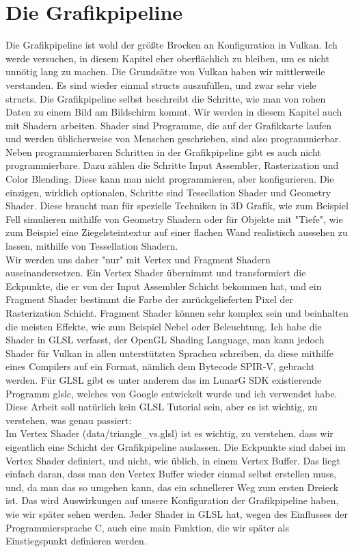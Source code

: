 \documentclass[11pt,a4paper]{report}
\begin{document}
\chapter{Die Grafikpipeline}
Die Grafikpipeline ist wohl der größte Brocken an Konfiguration in Vulkan. Ich werde versuchen, in diesem Kapitel eher oberflächlich zu bleiben, um es nicht unnötig lang zu machen. Die Grundsätze von Vulkan haben wir mittlerweile verstanden. Es sind wieder einmal structs auszufüllen, und zwar sehr viele structs. Die Grafikpipeline selbst beschreibt die Schritte, wie man von rohen Daten zu einem Bild am Bildschirm kommt. Wir werden in diesem Kapitel auch mit Shadern arbeiten. Shader sind Programme, die auf der Grafikkarte laufen und werden üblicherweise von Menschen geschrieben, sind also programmierbar. Neben programmierbaren Schritten in der Grafikpipeline gibt es auch nicht programmierbare. Dazu zählen die Schritte Input Assembler, Rasterization und Color Blending. Diese kann man nicht programmieren, aber konfigurieren. Die einzigen, wirklich optionalen, Schritte sind Tessellation Shader und Geometry Shader. Diese braucht man für spezielle Techniken in 3D Grafik, wie zum Beispiel Fell simulieren mithilfe von Geometry Shadern oder für Objekte mit "Tiefe", wie zum Beispiel eine Ziegelsteintextur auf einer flachen Wand realistisch aussehen zu lassen, mithilfe von Tessellation Shadern.\\
Wir werden uns daher "nur" mit Vertex und Fragment Shadern auseinandersetzen. Ein Vertex Shader übernimmt und transformiert die Eckpunkte, die er von der Input Assembler Schicht bekommen hat, und ein Fragment Shader bestimmt die Farbe der zurückgelieferten Pixel der Rasterization Schicht. Fragment Shader können sehr komplex sein und beinhalten die meisten Effekte, wie zum Beispiel Nebel oder Beleuchtung. Ich habe die Shader in GLSL verfasst, der OpenGL Shading Language, man kann jedoch Shader für Vulkan in allen unterstützten Sprachen schreiben, da diese mithilfe eines Compilers auf ein Format, nämlich dem Bytecode SPIR-V, gebracht werden. Für GLSL gibt es unter anderem das im LunarG SDK existierende Programm glslc, welches von Google entwickelt wurde und ich verwendet habe. Diese Arbeit soll natürlich kein GLSL Tutorial sein, aber es ist wichtig, zu verstehen, was genau passiert:\\
Im Vertex Shader (data/triangle\_vs.glsl) ist es wichtig, zu verstehen, dass wir eigentlich eine Schicht der Grafikpipeline auslassen. Die Eckpunkte sind dabei im Vertex Shader definiert, und nicht, wie üblich, in einem Vertex Buffer. Das liegt einfach daran, dass man den Vertex Buffer wieder einmal selbst erstellen muss, und, da man das so umgehen kann, das ein schnellerer Weg zum ersten Dreieck ist. Das wird Auswirkungen auf unsere Konfiguration der Grafikpipeline haben, wie wir später sehen werden. Jeder Shader in GLSL hat, wegen des Einflusses der Programmiersprache C, auch eine main Funktion, die wir später als Einstiegspunkt definieren werden.\\
\end{document}
